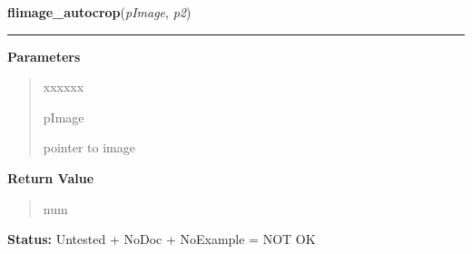 \hspace{.8\funcindent}\begin{boxedminipage}{\funcwidth}

    \raggedright \textbf{flimage\_autocrop}(\textit{pImage}, \textit{p2})

    \vspace{-1.5ex}

    \rule{\textwidth}{0.5\fboxrule}
\setlength{\parskip}{2ex}
\setlength{\parskip}{1ex}
      \textbf{Parameters}
      \vspace{-1ex}

      \begin{quote}
        \begin{Ventry}{xxxxxx}

          \item[pImage]

          pointer to image

        \end{Ventry}

      \end{quote}

      \textbf{Return Value}
    \vspace{-1ex}

      \begin{quote}
      num

      \end{quote}

\textbf{Status:} Untested + NoDoc + NoExample = NOT OK



    \end{boxedminipage}

    \label{xformslib:library:flimage_get_autocrop}

    \vspace{0.5ex}

